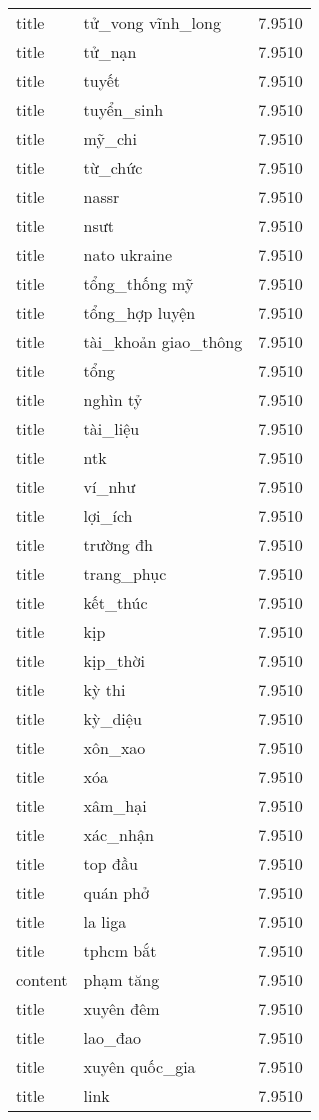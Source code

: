 \documentclass{article}
\begin{document}
\begin{tabular}{lll}
title & tử\_vong vĩnh\_long & 7.9510\\
title & tử\_nạn & 7.9510\\
title & tuyết & 7.9510\\
title & tuyển\_sinh & 7.9510\\
title & mỹ\_chi & 7.9510\\
title & từ\_chức & 7.9510\\
title & nassr & 7.9510\\
title & nsưt & 7.9510\\
title & nato ukraine & 7.9510\\
title & tổng\_thống mỹ & 7.9510\\
title & tổng\_hợp luyện & 7.9510\\
title & tài\_khoản giao\_thông & 7.9510\\
title & tổng & 7.9510\\
title & nghìn tỷ & 7.9510\\
title & tài\_liệu & 7.9510\\
title & ntk & 7.9510\\
title & ví\_như & 7.9510\\
title & lợi\_ích & 7.9510\\
title & trường đh & 7.9510\\
title & trang\_phục & 7.9510\\
title & kết\_thúc & 7.9510\\
title & kịp & 7.9510\\
title & kịp\_thời & 7.9510\\
title & kỳ thi & 7.9510\\
title & kỳ\_diệu & 7.9510\\
title & xôn\_xao & 7.9510\\
title & xóa & 7.9510\\
title & xâm\_hại & 7.9510\\
title & xác\_nhận & 7.9510\\
title & top đầu & 7.9510\\
title & quán phở & 7.9510\\
title & la liga & 7.9510\\
title & tphcm bắt & 7.9510\\
content & phạm tăng & 7.9510\\
title & xuyên đêm & 7.9510\\
title & lao\_đao & 7.9510\\
title & xuyên quốc\_gia & 7.9510\\
title & link & 7.9510\\

\end{tabular}
\end{document}
